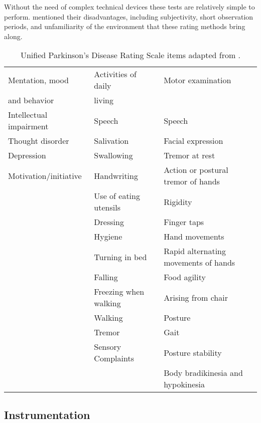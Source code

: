 Without the need of complex technical devices these tests are relatively simple to perform. \citeauthor{klerk_long-term_2009} \cite{klerk_long-term_2009} mentioned their disadvantages, including subjectivity, short observation periods, and unfamiliarity of the environment that these rating methods bring along.

\begin{table}[h]
\begin{tabular}{lll}
\hline
Mentation, mood & Activities of daily & Motor examination \\
and behavior & living & \\
\hline
Intellectual impairment & Speech & Speech \\

Thought disorder & Salivation & Facial expression\\

Depression & Swallowing & Tremor at rest \\

Motivation/initiative & Handwriting & Action or postural tremor of hands \\

& Use of eating utensils & Rigidity \\

& Dressing & Finger taps\\

& Hygiene & Hand movements\\

& Turning in bed & Rapid alternating movements of hands\\

& Falling & Food agility\\

& Freezing when walking & Arising from chair \\

& Walking & Posture\\

& Tremor & Gait\\

& Sensory Complaints & Posture stability\\

& & Body bradikinesia and hypokinesia \\
\hline
\end{tabular}
\caption{Unified Parkinson's Disease Rating Scale items adapted from \cite{herndon_handbook_2006}.}
\label{tab:UPDRS}
\end{table}

\subsection{Instrumentation}

